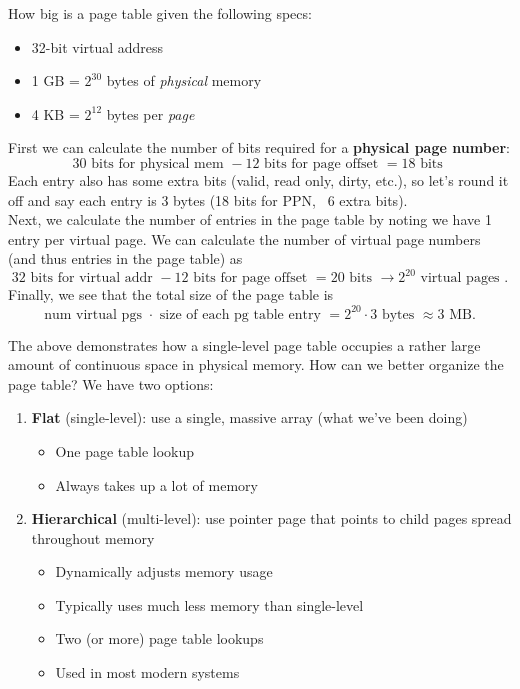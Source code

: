 
\begin{problem}
  How big is a page table given the following specs:
  \begin{itemize}
    \item 32-bit virtual address
    \item 1 GB = \(2^{30}\) bytes of \emph{physical} memory
    \item 4 KB = \(2^{12}\) bytes per \emph{page}
  \end{itemize}
\end{problem}
\begin{answer}
  First we can calculate the number of bits required for a \textbf{physical page number}:
  \[
    30 \text{ bits for physical mem } - 12 \text{ bits for page offset } = 18 \text{ bits } 
  \]
  Each entry also has some extra bits (valid, read only, dirty, etc.), so let's round it off and say each entry is 3 bytes (18 bits for PPN, ~6 extra bits). \\
  Next, we calculate the number of entries in the page table by noting we have 1 entry per virtual page. We can calculate the number of virtual page numbers (and thus entries in the page table) as
  \[
    32 \text{ bits for virtual addr } - 12 \text{ bits for page offset } = 20 \text{ bits } \to 2^{20} \text{ virtual pages }. 
  \]
  Finally, we see that the total size of the page table is
  \[
    \text{num virtual pgs } \cdot \text{ size of each pg table entry } = 2^{20} \cdot 3 \text{ bytes } \approx 3 \text{ MB}.
  \]
\end{answer}

The above demonstrates how a single-level page table occupies a rather large amount of continuous space in physical memory. How can we better organize the page table? We have two options:
\begin{enumerate}
  \item \textbf{Flat} (single-level): use a single, massive array (what we've been doing)
  \begin{itemize}
    \item One page table lookup
    \item Always takes up a lot of memory
  \end{itemize}
  \item \textbf{Hierarchical} (multi-level): use pointer page that points to child pages spread throughout memory
  \begin{itemize}
    \item Dynamically adjusts memory usage
    \item Typically uses much less memory than single-level
    \item Two (or more) page table lookups
    \item Used in most modern systems
  \end{itemize}
\end{enumerate}

